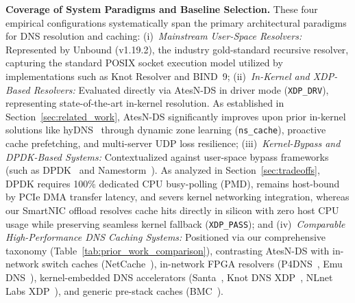\documentclass[a4paper,fleqn,colorlinks,hidelinks]{cas-sc}
\begin{document}
\textbf{Coverage of System Paradigms and Baseline Selection.} These four empirical configurations systematically span the primary architectural paradigms for DNS resolution and caching:
(i)~\textit{Mainstream User-Space Resolvers:} Represented by Unbound (v1.19.2), the industry gold-standard recursive resolver, capturing the standard POSIX socket execution model utilized by implementations such as Knot Resolver and BIND~9;
(ii)~\textit{In-Kernel and XDP-Based Resolvers:} Evaluated directly via AtesN-DS in driver mode (\texttt{XDP\_DRV}), representing state-of-the-art in-kernel resolution. As established in Section~\ref{sec:related_work}, AtesN-DS significantly improves upon prior in-kernel solutions like hyDNS~\citep{10.1145/3672197.3673439} through dynamic zone learning (\texttt{ns\_cache}), proactive cache prefetching, and multi-server UDP loss resilience;
(iii)~\textit{Kernel-Bypass and DPDK-Based Systems:} Contextualized against user-space bypass frameworks (such as DPDK~\citep{kourtis2015enhancing} and Namestorm~\citep{10.1145/2740070.2626311}). As analyzed in Section~\ref{sec:tradeoffs}, DPDK requires 100\% dedicated CPU busy-polling (PMD), remains host-bound by PCIe DMA transfer latency, and severs kernel networking integration, whereas our SmartNIC offload resolves cache hits directly in silicon with zero host CPU usage while preserving seamless kernel fallback (\texttt{XDP\_PASS}); and
(iv)~\textit{Comparable High-Performance DNS Caching Systems:} Positioned via our comprehensive taxonomy (Table~\ref{tab:prior_work_comparison}), contrasting AtesN-DS with in-network switch caches (NetCache~\citep{10.1145/3132747.3132764}), in-network FPGA resolvers (P4DNS~\citep{woodruff2019p4dns}, Emu DNS~\citep{203245}), kernel-embedded DNS accelerators (Santa~\citep{8493053}, Knot DNS XDP~\citep{Vackova2021KnotXDP}, NLnet Labs XDP~\citep{toorop2021xdperiments}), and generic pre-stack caches (BMC~\citep{ghiglieri2021bmc}).
\end{document}
